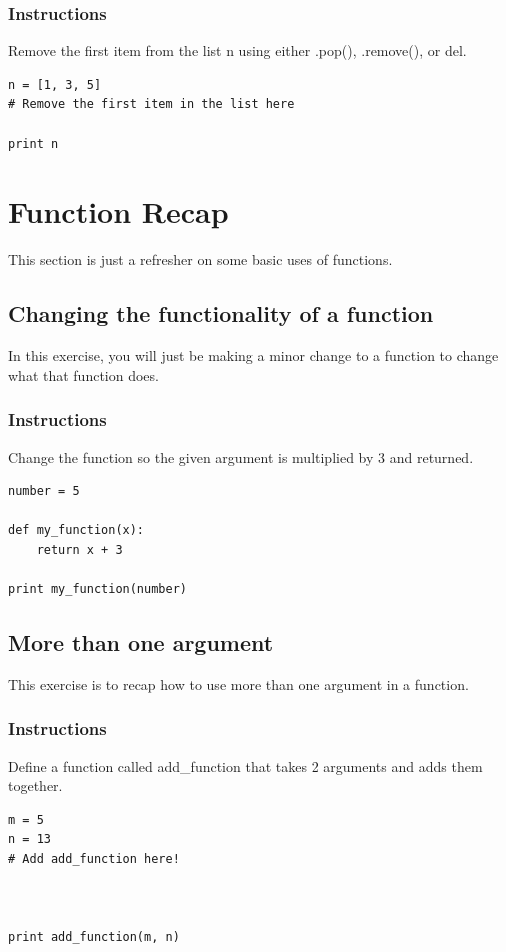 \documentclass[12pt,a4paper,final,twoside,onecolumn,titlepage]{book}
\begin{document}
\subsubsection{Instructions}
Remove the first item from the list n using either .pop(), .remove(), or del.
\begin{lstlisting}
n = [1, 3, 5]
# Remove the first item in the list here

print n
\end{lstlisting}

\section{Function Recap}
This section is just a refresher on some basic uses of functions.
\subsection{Changing the functionality of a function}

In this exercise, you will just be making a minor change to a function to change what that function does.
\subsubsection{Instructions}

Change the function so the given argument is multiplied by 3 and returned.
\begin{lstlisting}
number = 5

def my_function(x):
    return x + 3

print my_function(number)
\end{lstlisting}

\subsection{More than one argument}

This exercise is to recap how to use more than one argument in a function.
\subsubsection{Instructions}

Define a function called add\_function that takes 2 arguments and adds them together.
\begin{lstlisting}
m = 5
n = 13
# Add add_function here!



print add_function(m, n)
\end{lstlisting}
\end{document}
